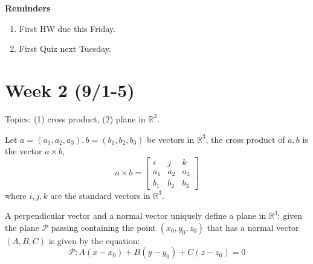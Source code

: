 \documentclass[openany]{book}
\newcommand{\R}{\mathbb{R}}
\begin{document}
\noindent
\textbf{Reminders}
\begin{enumerate}
    \item First HW due this Friday.
    \item First Quiz next Tuesday.
\end{enumerate}





\newpage
\section*{\centering Week 2 (9/1-5)}





\renewcommand\thesection{\arabic{section}}
\noindent
Topics: (1) cross product, (2) plane in $\R^3$.

\begin{defn}
    Let $a=(a_1,a_2,a_3), b=(b_1,b_2,b_3)$ be vectors in $\R^3$, the cross product of $a,b$ is the vector $a\times b$, 
    \begin{equation*}
        a\times b=\begin{bmatrix}
            i&j&k\\
            a_1&a_2&a_3\\
            b_1&b_2&b_3
        \end{bmatrix}
    \end{equation*}
    where $i,j,k$ are the standard vectors in $\R^3$.
\end{defn}

\begin{defn}
    A perpendicular vector and a normal vector uniquely define a plane in $\R^3$: given the plane $\mathcal{P}$ passing containing the point $(x_0,y_0,z_0)$ that has a normal vector $(A,B,C)$ is given by the equation:
    \begin{equation*}
        \mathcal{P}: A(x-x_0)+B(y-y_0)+C(z-z_0)=0
    \end{equation*}
\end{defn}
\end{document}
